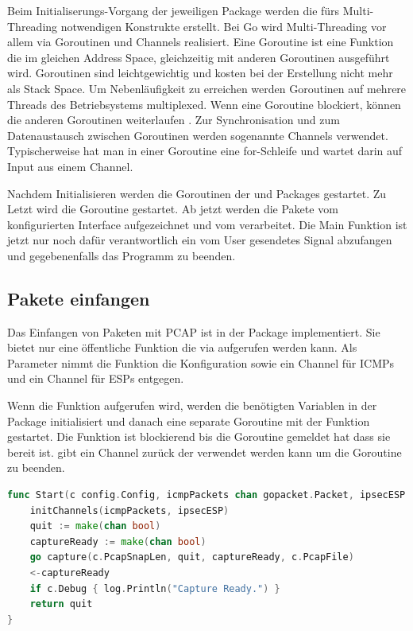 Beim Initialiserungs-Vorgang der jeweiligen Package werden die fürs Multi-Threading notwendigen Konstrukte erstellt. Bei Go wird Multi-Threading vor allem via Goroutinen und Channels realisiert. Eine Goroutine ist eine Funktion die im gleichen Address Space, gleichzeitig mit anderen Goroutinen ausgeführt wird. Goroutinen sind leichtgewichtig und kosten bei der Erstellung nicht mehr als Stack Space. Um Nebenläufigkeit zu erreichen werden Goroutinen auf mehrere Threads des Betriebsystems multiplexed. Wenn eine Goroutine blockiert, können die anderen Goroutinen weiterlaufen \cite[:1391]{effective_go}.
Zur Synchronisation und zum Datenaustausch zwischen Goroutinen werden sogenannte Channels verwendet. Typischerweise hat man in einer Goroutine eine for-Schleife und wartet darin auf Input aus einem Channel.

Nachdem Initialisieren werden die Goroutinen der  und  Packages gestartet. Zu Letzt wird die  Goroutine gestartet. Ab jetzt werden die Pakete vom konfigurierten Interface aufgezeichnet und vom \tool{} verarbeitet. Die Main Funktion ist jetzt nur noch dafür verantwortlich ein vom User gesendetes  Signal abzufangen und gegebenenfalls das Programm zu beenden.

\subsection{Pakete einfangen}
Das Einfangen von Paketen mit \ac{PCAP} ist in der  Package implementiert. Sie bietet nur eine öffentliche Funktion die via  aufgerufen werden kann. Als Parameter nimmt die Funktion die Konfiguration sowie ein Channel für \ac{ICMP}s und ein Channel für \ac{ESP}s entgegen. 

Wenn die Funktion  aufgerufen wird, werden die benötigten Variablen in der  Package initialisiert und danach eine separate Goroutine mit der  Funktion gestartet. Die  Funktion ist blockierend bis die  Goroutine gemeldet hat dass sie bereit ist.  gibt ein Channel zurück der verwendet werden kann um die \linebreak {} Goroutine zu beenden.

\begin{lstlisting}[language=go, caption=Öffentliche Funktion capture.Start()]     
func Start(c config.Config, icmpPackets chan gopacket.Packet, ipsecESP chan gopacket.Packet) chan bool {
	initChannels(icmpPackets, ipsecESP)
	quit := make(chan bool)
	captureReady := make(chan bool)
	go capture(c.PcapSnapLen, quit, captureReady, c.PcapFile)
	<-captureReady
	if c.Debug { log.Println("Capture Ready.") }
	return quit
}
\end{lstlisting}


